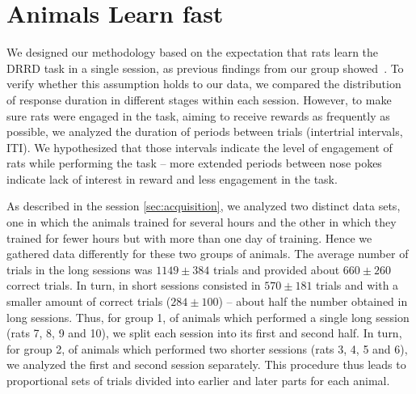 \chapter{Animals Learn fast}
\label{chap:learning}


We designed our methodology based on the expectation that rats learn the DRRD task in a single session, as previous findings from our group showed~\cite{ReyesDRRD}. To verify whether this assumption holds to our data, we compared the distribution of response duration in different stages within each session. However, to make sure rats were engaged in the task, aiming to receive rewards as frequently as possible, we analyzed the duration of periods between trials (intertrial intervals, ITI). We hypothesized that those intervals indicate the level of engagement of rats while performing the task -- more extended periods between nose pokes indicate lack of interest in reward and less engagement in the task.

As described in the session \ref{sec:acquisition}, we analyzed two distinct data sets, one in which the animals trained for several hours and the other in which they trained for fewer hours but with more than one day of training.  Hence we gathered data differently for these two groups of animals. The average number of trials in the long sessions was $1149 \pm 384$ trials and provided about $660 \pm 260$ correct trials. In turn, in short sessions consisted in $570 \pm 181$ trials and with a smaller amount of correct trials ($284\pm 100$) -- about half the number obtained in long sessions. Thus, for group 1, of animals which performed a single long session (rats 7, 8, 9 and 10), we split each session into its first and second half. In turn, for group 2, of animals which performed two shorter sessions (rats 3, 4, 5 and 6), we analyzed the first and second session separately. This procedure thus leads to proportional sets of trials divided into earlier and later parts for each animal.


